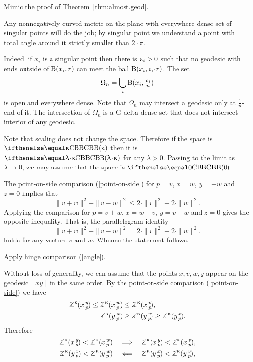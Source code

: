  Mimic the proof of Theorem~\ref{thm:almost.geod}.

Any nonnegatively curved metric on the plane with everywhere dense set of singular points will do the job;
by singular point we understand a point with total angle around it strictly smaller than $2\cdot\pi$.

Indeed, if $x_i$ is a singular point then there is $\upvarepsilon_i>0$ such that no geodesic with ends outside of $\mathrm{B}{}(x_i,r)$ can meet the ball $\oBall(x_i,\eps_i\cdot r)$.
The set 
\[\Omega_n=\bigcup_i \mathrm{B}{}(x_i,\tfrac{\upvarepsilon_i}n)\]
is open and everywhere dense.
Note that $\Omega_n$ may intersect a geodesic only at $\tfrac1n$-end of it.
The intersection of $\Omega_n$ is a G-delta dense set that does not intersect interior of any geodesic.

Note that scaling does not change the space.
Therefore if the space is $\Alex\kappa$ then it is $\Alex{\lambda\cdot\kappa}$ for any $\lambda>0$.
Passing to the limit as $\lambda\to 0$, we may assume that the space is $\Alex0$.

The point-on-side comparison (\ref{point-on-side}) for $p=v$, $x=w$, $y=-w$ and $z=0$ implies that 
\[\|v+w\|^2+\|v-w\|^2\le 2\cdot\|v\|^2+2\cdot\|w\|^2.\]
Applying the comparison for 
$p=v+w$, $x=w-v$, $y=v-w$ and $z=0$ gives the opposite inequality.
That is, the parallelogram identity
\[\|v+w\|^2+\|v-w\|^2= 2\cdot\|v\|^2+2\cdot\|w\|^2.\]
holds for any vectors $v$ and $w$.
Whence the statement follows.

Apply hinge comparison (\ref{angle}).

 Without loss of generality, we can assume that the points $x,v,w,y$ appear on the geodesic $[xy]$ in the same order.
By the point-on-side comparison (\ref{point-on-side}) we have
\begin{align*}
\angk\kappa xyp\le\angk\kappa xwp&\le \angk\kappa xvp,
\\
\angk\kappa ywp&\ge\angk\kappa yvp\ge\angk\kappa yxp.
\end{align*}
Therefore
\begin{align*}\angk\kappa xyp<\angk\kappa xwp
\quad&\Longrightarrow\quad
\angk\kappa xyp<\angk\kappa xvp,
\\
\angk\kappa yxp<\angk\kappa ywp
\quad&\Longleftarrow\quad
\angk\kappa yxp<\angk\kappa yvp,
\end{align*}

